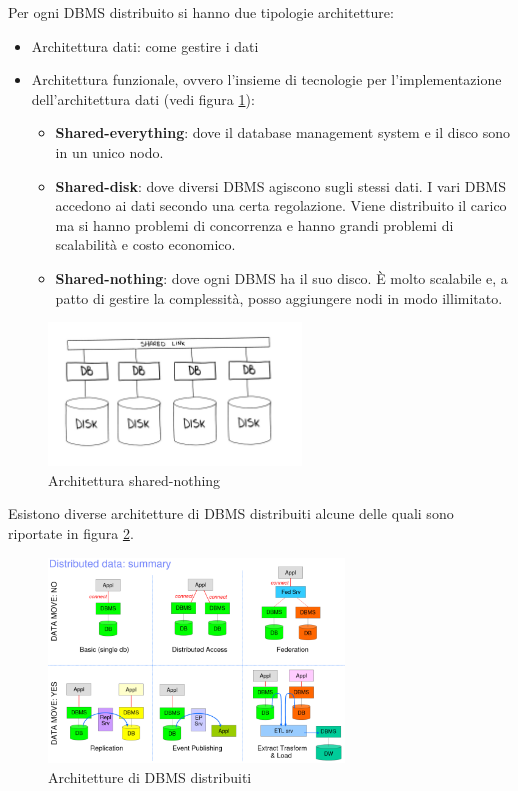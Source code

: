 Per ogni DBMS distribuito si hanno due tipologie architetture:
\begin{itemize}
      \item Architettura dati: come gestire i dati
      \item Architettura funzionale, ovvero l'insieme di tecnologie per l'implementazione
            dell'architettura dati (vedi figura \ref{fig:sharedNothing}):
            \begin{itemize}
                  \item \textbf{Shared-everything}: dove il database management
                        system e il disco sono in un unico nodo.
                  \item \textbf{Shared-disk}: dove diversi DBMS agiscono sugli
                        stessi dati. I vari DBMS accedono ai dati secondo una
                        certa regolazione. Viene distribuito il carico ma si
                        hanno problemi di concorrenza e hanno grandi problemi di
                        scalabilità e costo economico.
                  \item \textbf{Shared-nothing}: dove ogni DBMS ha il suo disco.
                        È molto scalabile e, a patto di gestire la complessità,
                        posso aggiungere nodi in modo illimitato.
            \end{itemize}
\end{itemize}
\begin{figure}[!ht]
      \centering
      \includegraphics[width=0.60\textwidth]{img/SharedNothing.jpg}
      \caption{Architettura shared-nothing}
      \label{fig:sharedNothing}
\end{figure}
Esistono diverse architetture di DBMS distribuiti alcune delle quali sono
riportate in figura \ref{fig:DBMS_distributed_architecture}.
\begin{figure}[!ht]
      \centering
      \includegraphics[width=0.7\textwidth]{./img/DBMS/DBMS_distributed_architecture.png}
      \caption{Architetture di DBMS distribuiti}
      \label{fig:DBMS_distributed_architecture}
\end{figure}

